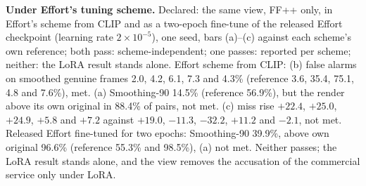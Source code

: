 \documentclass[10pt]{article}
\begin{document}
\textbf{Under Effort's tuning scheme.} Declared: the same view, FF++ only, in Effort's scheme from CLIP and as a two-epoch fine-tune
of the released Effort checkpoint (learning rate $2\times10^{-5}$), one seed, bars (a)--(c) against each scheme's own reference;
both pass: scheme-independent; one passes: reported per scheme; neither: the LoRA result stands alone. Effort scheme from CLIP: (b)
false alarms on smoothed genuine frames 2.0, 4.2, 6.1, 7.3 and 4.3\% (reference 3.6, 35.4, 75.1, 4.8 and 7.6\%), met. (a)
Smoothing-90 14.5\% (reference 56.9\%), but the render above its own original in 88.4\% of pairs, not met. (c) miss rise $+22.4$,
$+25.0$, $+24.9$, $+5.8$ and $+7.2$ against $+19.0$, $-11.3$, $-32.2$, $+11.2$ and $-2.1$, not met. Released Effort fine-tuned for two
epochs: Smoothing-90 39.9\%, above own original 96.6\% (reference 55.3\% and 98.5\%), (a) not met. Neither passes; the LoRA result
stands alone, and the view removes the accusation of the commercial service only under LoRA.
\end{document}
